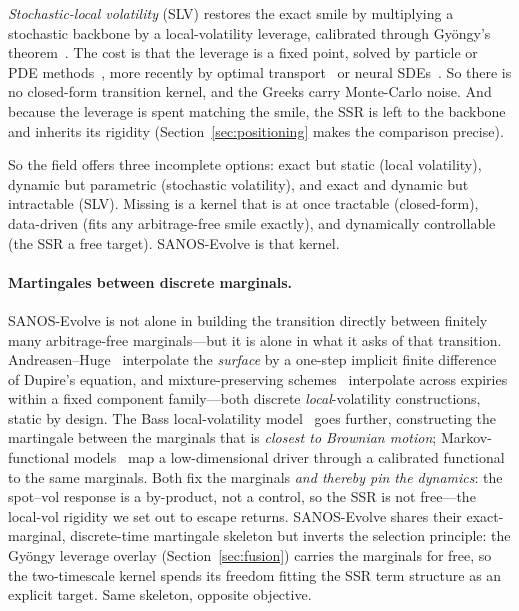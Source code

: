 \documentclass[11pt]{article}
\begin{document}
\emph{Stochastic-local volatility} (SLV) restores the exact smile by multiplying a stochastic backbone
by a local-volatility leverage, calibrated through Gy\"ongy's theorem~\cite{gyongy1986,jex1999,lipton2002}.
The cost is that the leverage is a fixed point, solved by particle or PDE
methods~\cite{guyonhl2012,ren2007}, more recently by optimal transport~\cite{guo2022ot} or neural
SDEs~\cite{cuchiero2020}. So there is no closed-form transition kernel, and the Greeks carry
Monte-Carlo noise. And because the leverage is spent matching the smile, the SSR is left to the
backbone and inherits its rigidity (Section~\ref{sec:positioning} makes the comparison precise).

So the field offers three incomplete options: exact but static (local volatility), dynamic but
parametric (stochastic volatility), and exact and dynamic but intractable (SLV). Missing is a kernel
that is at once tractable (closed-form), data-driven (fits any arbitrage-free smile exactly), and
dynamically controllable (the SSR a free target). SANOS-Evolve is that kernel.

\paragraph{Martingales between discrete marginals.} SANOS-Evolve is not alone in building the
transition directly between finitely many arbitrage-free marginals---but it is alone in what it
asks of that transition. Andreasen--Huge~\cite{andreasenhuge2011} interpolate the \emph{surface}
by a one-step implicit finite difference of Dupire's equation, and mixture-preserving
schemes~\cite{vandenbergmix2026} interpolate across expiries within a fixed component
family---both discrete \emph{local}-volatility constructions, static by design. The Bass
local-volatility model~\cite{conzehl2021,backhoff2020,qin2024bass} goes further, constructing the
martingale between the marginals that is \emph{closest to Brownian motion}; Markov-functional
models~\cite{huntkennedypelsser2000} map a low-dimensional driver through a calibrated functional
to the same marginals. Both fix the marginals \emph{and thereby pin the dynamics}: the spot--vol
response is a by-product, not a control, so the SSR is not free---the local-vol rigidity we set
out to escape returns. SANOS-Evolve shares their exact-marginal, discrete-time martingale
skeleton but inverts the selection principle: the Gy\"ongy leverage overlay
(Section~\ref{sec:fusion}) carries the marginals for free, so the two-timescale kernel spends its
freedom fitting the SSR term structure as an explicit target. Same skeleton, opposite objective.
\end{document}
